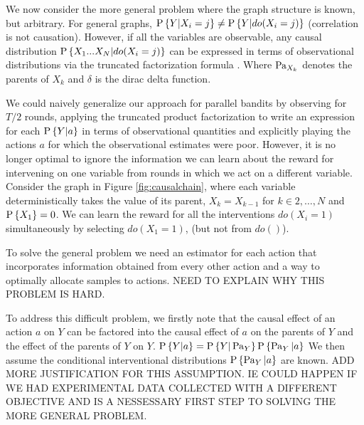 
\newcommand{\calP}{\mathcal P}
\newcommand{\x}{\boldsymbol{x}}
\newcommand{\Ps}{\operatorname{P}}

We now consider the more general problem where the graph structure is known, but arbitrary. For general graphs, $\P{Y|X_i=j} \neq \P{Y|do(X_i=j)}$ (correlation is not causation). However, if all the variables are observable, any causal distribution $\P{X_1...X_N|do(X_i=j)}$ can be expressed in terms of observational distributions via the truncated factorization formula \cite{Pearl2000}. 
Where $\parents{X_k}$ denotes the parents of $X_k$ and $\delta$ is the dirac delta function. 

We could naively generalize our approach for parallel bandits by observing for $T/2$ rounds, applying the truncated product factorization to write an expression for each $\P{Y|a}$ in terms of observational quantities and explicitly playing the actions $a$ for which the observational estimates were poor. However, it is no longer optimal to ignore the information we can learn about the reward for intervening on one variable from rounds in which we act on a different variable. Consider the graph in Figure \ref{fig:causalchain}, where each variable deterministically takes the value of its parent, $X_k = X_{k-1}$ 
for $k\in {2,\ldots,N}$ and $\P{X_1} = 0$. 
We can learn the reward for all the interventions $do(X_i = 1)$ simultaneously by selecting $do(X_1 = 1)$, (but not from $do()$). 

To solve the general problem we need an estimator for each action that incorporates information obtained from every other action and a way to optimally allocate samples to actions. NEED TO EXPLAIN WHY THIS PROBLEM IS HARD. 

To address this difficult problem, we firstly note that the causal effect of an action $a$ on $Y$ can be factored into the causal effect of $a$ on the parents of $Y$ and the effect of the parents of $Y$ on $Y$. $\P{Y|a} = \P{Y|\parents{Y}}\P{\parents{Y}|a}$ We then assume the conditional interventional distributions $\P{\parents{Y}|a}$ are known. ADD MORE JUSTIFICATION FOR THIS ASSUMPTION. IE COULD HAPPEN IF WE HAD EXPERIMENTAL DATA COLLECTED WITH A DIFFERENT OBJECTIVE AND IS A NESSESSARY FIRST STEP TO SOLVING THE MORE GENERAL PROBLEM. 




